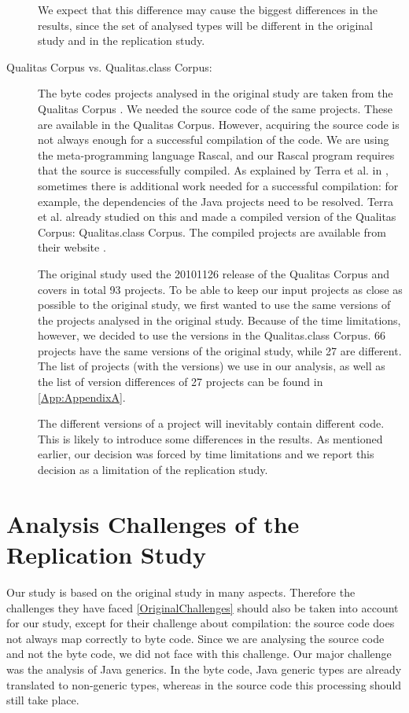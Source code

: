 \documentclass{uvamscse}
\begin{document}
\begin{description}
We expect that this difference may cause the biggest differences in the results, since the set of analysed types will be different in the original study and in the replication study.

\item[Qualitas Corpus vs. Qualitas.class Corpus:] The byte codes projects analysed in the original study are taken from the Qualitas Corpus \cite{QualitasCorpus:APSEC:2010}. We needed the source code of the same projects. These are available in the Qualitas Corpus. However, acquiring the source code is not always enough for a successful compilation of the code. We are using the meta-programming language Rascal, and our Rascal program requires that the source is successfully compiled. As explained by Terra et al. in \cite{qualitas.class}, sometimes there is additional work needed for a successful compilation: for example, the dependencies of the Java projects need to be resolved. Terra et al. already studied on this and made a compiled version of the Qualitas Corpus: Qualitas.class Corpus. The compiled projects are available from their website \cite{qualitas.classCorpusWeb}. 

The original study used the 20101126 release of the Qualitas Corpus and covers in total 93 projects. To be able to keep our input projects as close as possible to the original study, we first wanted to use the same versions of the projects analysed in the original study. Because of the time limitations, however, we decided to use the versions in the Qualitas.class Corpus. 66 projects have the same versions of the original study, while 27 are different. The list of projects (with the versions) we use in our analysis, as well as the list of version differences of 27 projects can be found in \ref{App:AppendixA}.

The different versions of a project will inevitably contain different code. This is likely to introduce some differences in the results. As mentioned earlier, our decision was forced by time limitations and we report this decision as a limitation of the replication study.


\end{description}


\section{Analysis Challenges of the Replication Study} \label{ReplicationChallenges} 
Our study is based on the original study in many aspects. Therefore the challenges they have faced \ref{OriginalChallenges} should also be taken into account for our study, except for their challenge about compilation: the source code does not always map correctly to byte code. Since we are analysing the source code and not the byte code, we did not face with this challenge. Our major challenge was the analysis of Java generics. In the byte code, Java generic types are already translated to non-generic types, whereas in the source code this processing should still take place. 
\end{document}
